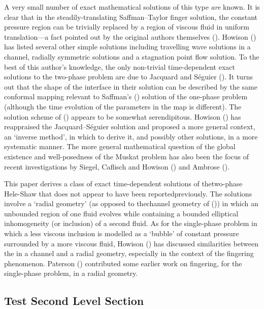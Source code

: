 \documentclass[fleqn]{jleo}
\begin{document}
A very small number of exact mathematical solutions of this type {\em are} known. It is clear that in the steadily-translating Saffman--Taylor finger
solution, the constant pressure region can be trivially replaced by
a region of viscous fluid in uniform translation---a fact
pointed out by the original authors themselves (\citealt{ST}).
Howison (\citealt{Howison}) has listed several other simple solutions including
travelling wave solutions in a channel, radially symmetric
solutions and a stagnation point flow solution. To the best of this author's knowledge, the only non-trivial time-dependent exact solutions to the two-phase problem are due to Jacquard and S\'eguier (\citealt{JS}). It turns out that the shape of the interface in their solution can be described by the same conformal mapping relevant to Saffman's (\citealt{PGS2}) solution of the one-phase problem
(although the time evolution of the parameters in the map
is different). The solution scheme of (\citealt{JS}) appears to
be somewhat serendipitous. Howison (\citealt{Howison}) has reappraised the Jacquard--S\'eguier
solution and proposed a more general context, an `inverse method', 
in which to derive it, and possibly other solutions,
in a more systematic manner. The more general mathematical
question of the global existence and well-posedness of the Muskat
problem has also been the focus of recent investigations by Siegel, Caflisch and Howison (\citealt{Sieg}) and Ambrose (\citealt{Ambrose}).

This paper derives a class of exact time-dependent solutions of the\break two-phase Hele-Shaw  that does not appear to have been reported\break previously.
The solutions involve a `radial geometry' (as opposed
to the\break channel geometry of (\citealt{JS})) in which 
an unbounded region of one fluid evolves 
while containing a bounded elliptical inhomogeneity
(or inclusion) of a second fluid.
As for the single-phase problem in which a
less viscous inclusion is modelled as a `bubble' of constant
pressure surrounded by a 
more viscous fluid, Howison (\citealt{How10}) has discussed similarities
between the  in a channel and a radial 
geometry, especially in the context of the fingering
phenomenon. Paterson (\citealt{Pat}) contributed some earlier work
on fingering, for the single-phase problem, in a radial geometry.

\subsection{Test Second Level Section}
\end{document}
